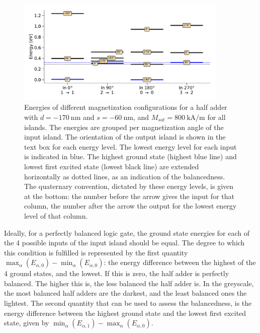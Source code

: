 \documentclass[11pt,a4paper,english]{article}
\begin{document}
\begin{figure}
    \centering
    \includegraphics[width=0.9\textwidth]{Figures/half_adder/energylevels/table(d170,s-60)_energylevels.pdf}
    \caption{Energies of different magnetization configurations for a half adder with $d=\SI{-170}{\nano\metre}$ and $s=\SI{-60}{\nano\metre}$, and $M_{sat} = \SI{800}{\kilo\ampere\per\metre}$ for all islands. The energies are grouped per magnetization angle of the input island. The orientation of the output island is shown in the text box for each energy level. The lowest energy level for each input is indicated in blue. The highest ground state (highest blue line) and lowest first excited state (lowest black line) are extended horizontally as dotted lines, as an indication of the balancedness. The quaternary convention, dictated by these energy levels, is given at the bottom: the number before the arrow gives the input for that column, the number after the arrow the output for the lowest energy level of that column.}
    \label{fig:HalfAdder_000006_energylevels_d170_s-60}
\end{figure}

Ideally, for a perfectly balanced logic gate, the ground state energies for each of the 4 possible inputs of the input island should be equal. The degree to which this condition is fulfilled is represented by the first quantity $\max_\alpha(E_{\alpha,0}) - \min_\alpha(E_{\alpha,0})$: the energy difference between the highest of the 4 ground states, and the lowest. If this is zero, the half adder is perfectly balanced. The higher this is, the less balanced the half adder is. In the greyscale, the most balanced half adders are the darkest, and the least balanced ones the lightest. 
The second quantity that can be used to assess the balancedness, is the energy difference between the highest ground state and the lowest first excited state, given by $\min_\alpha(E_{\alpha,1}) - \max_\alpha(E_{\alpha,0})$.
\end{document}
